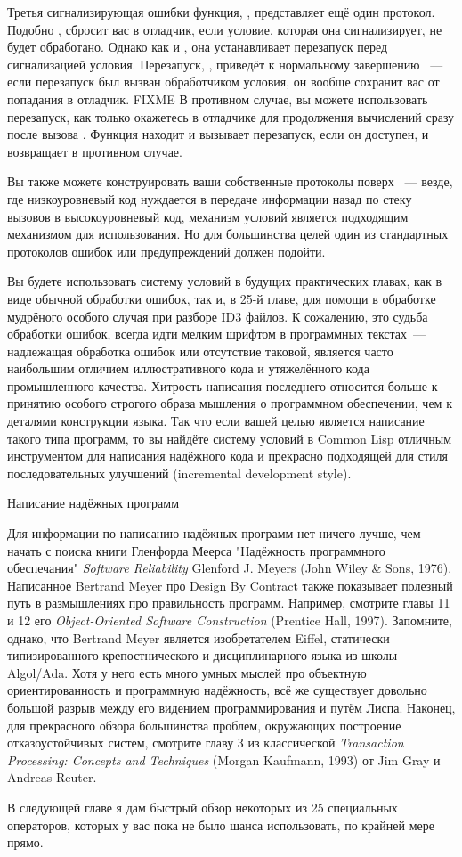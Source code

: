 Третья сигнализирующая ошибки функция, , представляет ещё один протокол.
Подобно ,  сбросит вас в отладчик, если условие, которая она
сигнализирует, не будет обработано. Однако как и , она устанавливает перезапуск
перед сигнализацией условия. Перезапуск, , приведёт к нормальному
завершению ~--- если перезапуск был вызван обработчиком условия, он вообще
сохранит вас от попадания в отладчик. FIXME В противном случае, вы можете использовать
перезапуск, как только окажетесь в отладчике для продолжения вычислений сразу после вызова
. Функция  находит и вызывает  перезапуск, если
он доступен, и возвращает  в противном случае.

Вы также можете конструировать ваши собственные протоколы поверх ~--- везде,
где низкоуровневый код нуждается в передаче информации назад по стеку вызовов в
высокоуровневый код, механизм условий является подходящим механизмом для использования. Но
для большинства целей один из стандартных протоколов ошибок или предупреждений должен
подойти.

Вы будете использовать систему условий в будущих практических главах, как в виде обычной
обработки ошибок, так и, в 25-й главе, для помощи в обработке мудрёного особого случая при
разборе ID3 файлов.  К сожалению, это судьба обработки ошибок, всегда идти мелким шрифтом
в программных текстах~--- надлежащая обработка ошибок или отсутствие таковой, является
часто наибольшим отличием иллюстративного кода и утяжелённого кода промышленного качества.
Хитрость написания последнего относится больше к принятию особого строгого образа мышления
о программном обеспечении, чем к деталями конструкции языка. Так что если вашей целью
является написание такого типа программ, то вы найдёте систему условий в Common Lisp
отличным инструментом для написания надёжного кода и прекрасно подходящей для стиля
последовательных улучшений (incremental development style).


Написание надёжных программ 

Для информации по написанию надёжных программ нет ничего лучше, чем начать с поиска книги
Гленфорда Меерса "Надёжность программного обеспечания" \textit{Software Reliability}
Glenford J. Meyers (John Wiley \& Sons, 1976). Написанное Bertrand Meyer про Design By
Contract также показывает полезный путь в размышлениях про правильность
программ. Например, смотрите главы 11 и 12 его \textit{Object-Oriented Software
  Construction} (Prentice Hall, 1997). Запомните, однако, что Bertrand Meyer является
изобретателем Eiffel, статически типизированного крепостнического и дисциплинарного языка
из школы Algol/Ada. Хотя у него есть много умных мыслей про объектную ориентированность и
программную надёжность, всё же существует довольно большой разрыв между его видением
программирования и путём Лиспа. Наконец, для прекрасного обзора большинства проблем,
окружающих построение отказоустойчивых систем, смотрите главу 3 из классической
\textit{Transaction Processing: Concepts and Techniques} (Morgan Kaufmann, 1993) от Jim
Gray и Andreas Reuter.


В следующей главе я дам быстрый обзор некоторых из 25 специальных операторов, которых у
вас пока не было шанса использовать, по крайней мере прямо.

